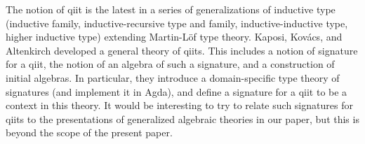 \documentclass{mscs}
\newcommand{\FYI}[1]{{#1}}
\begin{document}
%


The notion of qiit is the latest in a series of generalizations of inductive type (inductive family, inductive-recursive type and family, inductive-inductive type, higher inductive type) extending Martin-Löf type theory. Kaposi, Kov{\'{a}}cs, and Altenkirch \cite{kaposi:qiits} developed a general theory of qiits. This includes a notion of signature for a qiit, the notion of an algebra of such a signature, and a construction of initial algebras. In particular, they introduce a domain-specific type theory of signatures (and implement it in Agda), and define a signature for a qiit to be a context in this theory. It would be interesting to try to relate such signatures for qiits to the \FYI{presentations} of generalized algebraic theories in our paper, but this is beyond the scope of the present paper.
\end{document}
